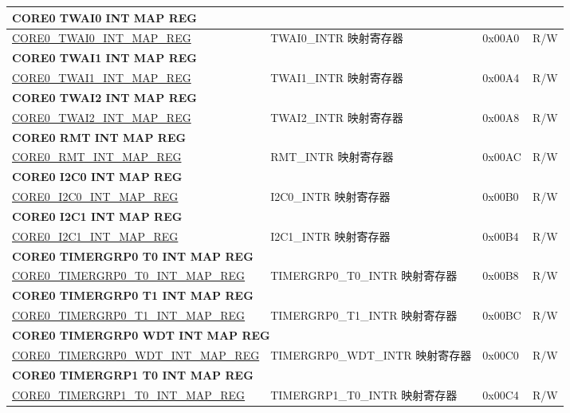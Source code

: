 \begin{longtable}{ | p{8.7cm} | p{6.2cm} | p{1.3cm} | p{1cm} | }
\multicolumn{4}{|l|}{\textbf{CORE0 TWAI0 INT MAP REG}} \\ \hline
\hyperref[regdesc:CORE0TWAI0INTMAPREG]{CORE0\_TWAI0\_INT\_MAP\_REG} & TWAI0\_INTR 映射寄存器 & 0x00A0 & R/W \\ \hline
\multicolumn{4}{|l|}{\textbf{CORE0 TWAI1 INT MAP REG}} \\ \hline
\hyperref[regdesc:CORE0TWAI1INTMAPREG]{CORE0\_TWAI1\_INT\_MAP\_REG} & TWAI1\_INTR 映射寄存器 & 0x00A4 & R/W \\ \hline
\multicolumn{4}{|l|}{\textbf{CORE0 TWAI2 INT MAP REG}} \\ \hline
\hyperref[regdesc:CORE0TWAI2INTMAPREG]{CORE0\_TWAI2\_INT\_MAP\_REG} & TWAI2\_INTR 映射寄存器 & 0x00A8 & R/W \\ \hline
\multicolumn{4}{|l|}{\textbf{CORE0 RMT INT MAP REG}} \\ \hline
\hyperref[regdesc:CORE0RMTINTMAPREG]{CORE0\_RMT\_INT\_MAP\_REG} & RMT\_INTR 映射寄存器 & 0x00AC & R/W \\ \hline
\multicolumn{4}{|l|}{\textbf{CORE0 I2C0 INT MAP REG}} \\ \hline
\hyperref[regdesc:CORE0I2C0INTMAPREG]{CORE0\_I2C0\_INT\_MAP\_REG} & I2C0\_INTR 映射寄存器 & 0x00B0 & R/W \\ \hline
\multicolumn{4}{|l|}{\textbf{CORE0 I2C1 INT MAP REG}} \\ \hline
\hyperref[regdesc:CORE0I2C1INTMAPREG]{CORE0\_I2C1\_INT\_MAP\_REG} & I2C1\_INTR 映射寄存器 & 0x00B4 & R/W \\ \hline
\multicolumn{4}{|l|}{\textbf{CORE0 TIMERGRP0 T0 INT MAP REG}} \\ \hline
\hyperref[regdesc:CORE0TIMERGRP0T0INTMAPREG]{CORE0\_TIMERGRP0\_T0\_INT\_MAP\_REG} & TIMERGRP0\_T0\_INTR 映射寄存器 & 0x00B8 & R/W \\ \hline
\multicolumn{4}{|l|}{\textbf{CORE0 TIMERGRP0 T1 INT MAP REG}} \\ \hline
\hyperref[regdesc:CORE0TIMERGRP0T1INTMAPREG]{CORE0\_TIMERGRP0\_T1\_INT\_MAP\_REG} & TIMERGRP0\_T1\_INTR 映射寄存器 & 0x00BC & R/W \\ \hline
\multicolumn{4}{|l|}{\textbf{CORE0 TIMERGRP0 WDT INT MAP REG}} \\ \hline
\hyperref[regdesc:CORE0TIMERGRP0WDTINTMAPREG]{CORE0\_TIMERGRP0\_WDT\_INT\_MAP\_REG} & TIMERGRP0\_WDT\_INTR 映射寄存器 & 0x00C0 & R/W \\ \hline
\multicolumn{4}{|l|}{\textbf{CORE0 TIMERGRP1 T0 INT MAP REG}} \\ \hline
\hyperref[regdesc:CORE0TIMERGRP1T0INTMAPREG]{CORE0\_TIMERGRP1\_T0\_INT\_MAP\_REG} & TIMERGRP1\_T0\_INTR 映射寄存器 & 0x00C4 & R/W \\ \hline

\end{longtable}
